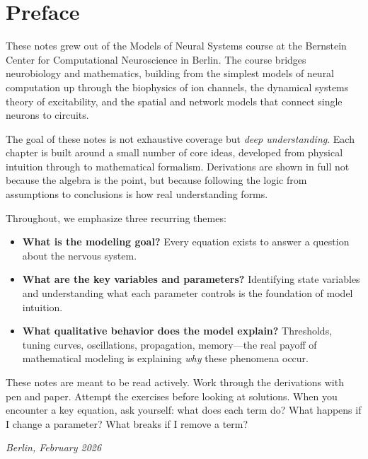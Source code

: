 \chapter*{Preface}

These notes grew out of the Models of Neural Systems course at the Bernstein Center for Computational Neuroscience in Berlin. The course bridges neurobiology and mathematics, building from the simplest models of neural computation up through the biophysics of ion channels, the dynamical systems theory of excitability, and the spatial and network models that connect single neurons to circuits.

The goal of these notes is not exhaustive coverage but \emph{deep understanding}. Each chapter is built around a small number of core ideas, developed from physical intuition through to mathematical formalism. Derivations are shown in full not because the algebra is the point, but because following the logic from assumptions to conclusions is how real understanding forms.

Throughout, we emphasize three recurring themes:
\begin{itemize}
  \item \textbf{What is the modeling goal?} Every equation exists to answer a question about the nervous system.
  \item \textbf{What are the key variables and parameters?} Identifying state variables and understanding what each parameter controls is the foundation of model intuition.
  \item \textbf{What qualitative behavior does the model explain?} Thresholds, tuning curves, oscillations, propagation, memory---the real payoff of mathematical modeling is explaining \emph{why} these phenomena occur.
\end{itemize}

These notes are meant to be read actively. Work through the derivations with pen and paper. Attempt the exercises before looking at solutions. When you encounter a key equation, ask yourself: what does each term do? What happens if I change a parameter? What breaks if I remove a term?

\bigskip
\noindent\textit{Berlin, February 2026}
